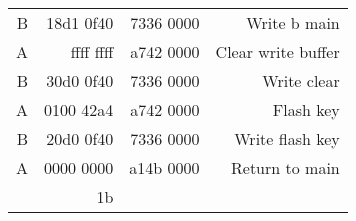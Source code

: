 \begin{table}[htbp]
\begin{tabular}{rrrr}
    B          & 18d1 0f40  & 7336 0000  & Write b main \\
    A          & ffff ffff  & a742 0000  & Clear write buffer \\
    B          & 30d0 0f40  & 7336 0000  & Write clear \\
    A          & 0100 42a4  & a742 0000  & Flash key \\
    B          & 20d0 0f40  & 7336 0000  & Write flash key \\
    A          & 0000 0000  & a14b 0000  & Return to main \\
               & 1b         &            &  \\
    \bottomrule
    \end{tabular}%

  \label{tab:ropresult}%
\end{table}%
